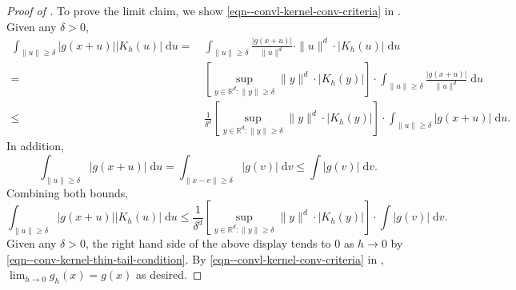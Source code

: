 \begin{proof}[Proof of ]
To prove the limit claim, we show \eqref{eqn--convl-kernel-conv-criteria} in
.
Given any \(\delta > 0\),
\begin{align*}
  \int_{\|u\| \geq \delta} |g (x + u)| \left| K_{h} (u) \right| \; \mathrm{d} u
  =
  & \, \int_{\|u\| \geq \delta} \frac{|g (x + u)|}{\|u\|^{d}} \cdot \|u\|^{d}
  \cdot \left| K_{h} (u) \right| \; \mathrm{d} u \\
  =
  & \, \left[ \sup_{y \in \mathbb{R}^{d} : \|y\| \geq \delta} \|y\|^{d} \cdot
  \left| K_{h} (y) \right| \right] \cdot \int_{\|u\| \geq \delta} \frac{|g (x +
  u)|}{\|u\|^{d}} \; \mathrm{d} u \\
  \leq
  & \, \frac{1}{\delta^{d}} \left[ \sup_{y \in \mathbb{R}^{d} : \|y\| \geq
  \delta} \|y\|^{d} \cdot \left| K_{h} (y) \right| \right] \cdot \int_{\|u\|
  \geq \delta} |g (x + u)| \; \mathrm{d} u.
\end{align*}
In addition,
\begin{equation*}
  \int_{\|u\| \geq \delta} |g (x + u)| \; \mathrm{d} u = \int_{\|x - v\| \geq
  \delta} |g (v)| \; \mathrm{d} v \leq \int |g (v)| \; \mathrm{d} v.
\end{equation*}
Combining both bounds,
\begin{equation*}
  \int_{\|u\| \geq \delta} |g (x + u)| \left| K_{h} (u) \right| \; \mathrm{d} u
  \leq \frac{1}{\delta^{d}} \left[ \sup_{y \in \mathbb{R}^{d} : \|y\| \geq
  \delta} \|y\|^{d} \cdot \left| K_{h} (y) \right| \right] \cdot \int |g (v)| \;
  \mathrm{d} v.
\end{equation*}
Given any \(\delta > 0\), the right hand side of the above display tends to 0 as
\(h \to 0\) by \eqref{eqn--conv-kernel-thin-tail-condition}.
By \eqref{eqn--convl-kernel-conv-criteria} in
, \(\lim_{h \to 0} g_{h} (x) = g (x)\) as
desired.
\end{proof}



